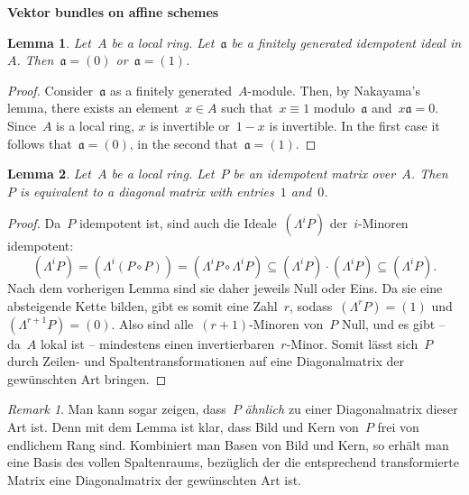 \documentclass[12pt]{scrartcl}
\theoremstyle{definition}
\theoremstyle{plain}
\newtheorem*{lemma}{Lemma}
\theoremstyle{remark}
\newtheorem*{rem}{Remark}
\newcommand{\aaa}{\mathfrak{a}}
\begin{document}
\enlargethispage{4em}

\begin{center}\huge\textbf{\textsf{Vektor bundles on affine schemes}}\end{center}
\bigskip

\begin{lemma}Let~$A$ be a local ring. Let~$\aaa$ be a finitely generated
idempotent ideal in $A$. Then~$\aaa = (0)$ or~$\aaa = (1)$.
\end{lemma}

\begin{proof}Consider~$\aaa$ as a finitely generated~$A$-module. Then, by
Nakayama's lemma, there exists an element~$x \in A$ such that~$x \equiv 1$
modulo~$\aaa$ and~$x \aaa = 0$. Since~$A$ is a local ring, $x$ is invertible
or~$1-x$ is invertible. In the first case it follows that~$\aaa = (0)$, in the
second that~$\aaa = (1)$.
\end{proof}

\begin{lemma}Let~$A$ be a local ring. Let~$P$ be an idempotent matrix over~$A$.
Then~$P$ is equivalent to a diagonal matrix with entries~$1$ and~$0$.
\end{lemma}

\begin{proof}Da~$P$ idempotent ist, sind auch die Ideale~$(\Lambda^i P)$
der~$i$-Minoren idempotent: \[ (\Lambda^i P) = (\Lambda^i (P \circ P)) =
(\Lambda^i P \circ \Lambda^i P) \subseteq (\Lambda^i P) \cdot (\Lambda^i P)
\subseteq (\Lambda^i P). \] Nach dem vorherigen Lemma sind sie daher jeweils
Null oder Eins. Da sie eine absteigende Kette bilden, gibt es somit eine
Zahl~$r$, sodass~$(\Lambda^r P) = (1)$ und~$(\Lambda^{r+1} P) = (0)$. Also sind
alle~$(r+1)$-Minoren von~$P$ Null, und es gibt -- da~$A$ lokal ist --
mindestens einen invertierbaren~$r$-Minor. Somit lässt sich~$P$ durch Zeilen-
und Spaltentransformationen auf eine Diagonalmatrix der gewünschten Art
bringen. \end{proof}

\begin{rem}Man kann sogar zeigen, dass~$P$ \emph{ähnlich} zu einer
Diagonalmatrix dieser Art ist. Denn mit dem Lemma ist klar, dass Bild und Kern
von~$P$ frei von endlichem Rang sind. Kombiniert man Basen von Bild und Kern,
so erhält man eine Basis des vollen Spaltenraums, bezüglich der die
entsprechend transformierte Matrix eine Diagonalmatrix der gewünschten Art
ist.\end{rem}
\end{document}
